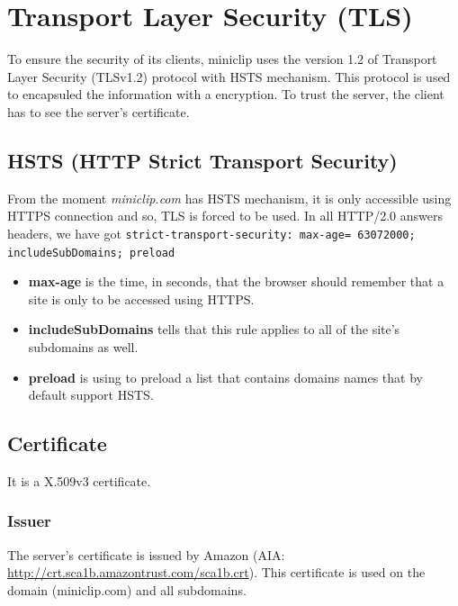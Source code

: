 \documentclass{article}
\begin{document}
\section{Transport Layer Security (TLS)}
\label{sec:TCP}

To ensure the security of its clients, miniclip uses the version 1.2 of Transport Layer Security (TLSv1.2) protocol with HSTS mechanism. This protocol is used to encapsuled the information with a encryption. To trust the server, the client has to see the server's certificate.


\subsection{HSTS (HTTP Strict Transport Security)}
\label{sub:hsts}

From the moment \textit{miniclip.com} has HSTS mechanism, it is only accessible using HTTPS connection and so, TLS is forced to be used. In all HTTP/2.0 answers headers, we have got \texttt{strict-transport-security: max-age=
63072000; includeSubDomains; preload}

\begin{itemize}
    \itemsep -0.1em
    \item \textbf{max-age} is the time, in seconds, that the browser should remember that a site is only to be accessed using HTTPS.
    \item \textbf{includeSubDomains} tells that this rule applies to all of the site's subdomains as well.
    \item \textbf{preload} is using to preload a list that contains domains names that by default support HSTS.
\end{itemize}

\subsection{Certificate}
\label{sub:certificate}

It is a X.509v3 certificate.

\subsubsection{Issuer}
The server's certificate is issued by Amazon (AIA: \url{http://crt.sca1b.amazontrust.com/sca1b.crt}). This certificate is used on the domain (miniclip.com) and all subdomains.
\end{document}
